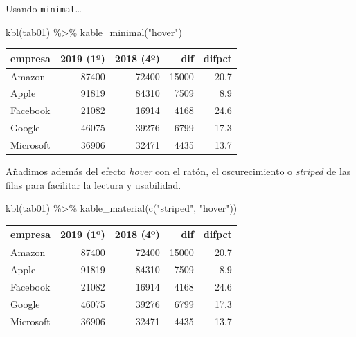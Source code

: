 \documentclass[
]{book}
\newenvironment{Shaded}{\begin{snugshade}}{\end{snugshade}}
\newcommand{\FunctionTok}[1]{\textcolor[rgb]{0.00,0.00,0.00}{#1}}
\newcommand{\NormalTok}[1]{#1}
\newcommand{\SpecialCharTok}[1]{\textcolor[rgb]{0.00,0.00,0.00}{#1}}
\newcommand{\StringTok}[1]{\textcolor[rgb]{0.31,0.60,0.02}{#1}}
\begin{document}
Usando \texttt{minimal}\ldots{}

\begin{Shaded}
\begin{Highlighting}[]
\FunctionTok{kbl}\NormalTok{(tab01) }\SpecialCharTok{\%\textgreater{}\%}
  \FunctionTok{kable\_minimal}\NormalTok{(}\StringTok{"hover"}\NormalTok{)}
\end{Highlighting}
\end{Shaded}

\begin{table}
\centering
\begin{tabular}[t]{l|r|r|r|r}
\hline
empresa & 2019 (1º) & 2018 (4º) & dif & difpct\\
\hline
Amazon & 87400 & 72400 & 15000 & 20.7\\
\hline
Apple & 91819 & 84310 & 7509 & 8.9\\
\hline
Facebook & 21082 & 16914 & 4168 & 24.6\\
\hline
Google & 46075 & 39276 & 6799 & 17.3\\
\hline
Microsoft & 36906 & 32471 & 4435 & 13.7\\
\hline
\end{tabular}
\end{table}

Añadimos además del efecto \emph{hover} con el ratón, el oscurecimiento o \emph{striped} de las filas para facilitar la lectura y usabilidad.

\begin{Shaded}
\begin{Highlighting}[]
\FunctionTok{kbl}\NormalTok{(tab01) }\SpecialCharTok{\%\textgreater{}\%}
  \FunctionTok{kable\_material}\NormalTok{(}\FunctionTok{c}\NormalTok{(}\StringTok{"striped"}\NormalTok{, }\StringTok{"hover"}\NormalTok{))}
\end{Highlighting}
\end{Shaded}

\begin{table}
\centering
\begin{tabular}[t]{l|r|r|r|r}
\hline
empresa & 2019 (1º) & 2018 (4º) & dif & difpct\\
\hline
Amazon & 87400 & 72400 & 15000 & 20.7\\
\hline
Apple & 91819 & 84310 & 7509 & 8.9\\
\hline
Facebook & 21082 & 16914 & 4168 & 24.6\\
\hline
Google & 46075 & 39276 & 6799 & 17.3\\
\hline
Microsoft & 36906 & 32471 & 4435 & 13.7\\
\hline
\end{tabular}
\end{table}
\end{document}
